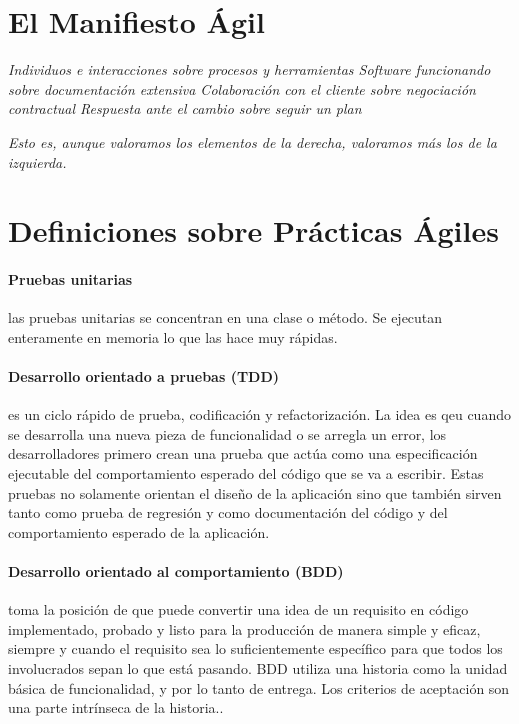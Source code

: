 \documentclass[journal]{IEEEtran}
\begin{document}
\appendices
\section{El Manifiesto Ágil}\label{apendice:a}

\begin{center}
\emph{Individuos e interacciones sobre procesos y herramientas
Software funcionando sobre documentación extensiva
Colaboración con el cliente sobre negociación contractual
Respuesta ante el cambio sobre seguir un plan}
\end{center}

\emph{Esto es, aunque valoramos los elementos de la derecha,
valoramos más los de la izquierda.}

\section{Definiciones sobre Prácticas Ágiles}\label{apendice:b}

\paragraph{Pruebas unitarias} las pruebas unitarias se concentran en una clase o método. Se ejecutan enteramente en memoria lo que las hace muy rápidas\cite{shore-warden}.

\paragraph{Desarrollo orientado a pruebas (TDD)} es un ciclo rápido de prueba, codificación y refactorización\cite{shore-warden}. La idea es qeu cuando se desarrolla una nueva pieza de funcionalidad o se arregla un error, los desarrolladores primero crean una prueba que actúa como una especificación ejecutable del comportamiento esperado del código que se va a escribir. Estas pruebas no solamente orientan el diseño de la aplicación sino que también sirven tanto como prueba de regresión y como documentación del código y del comportamiento esperado de la aplicación.\cite{humble}

\paragraph{Desarrollo orientado al comportamiento (BDD)} toma la posición de que puede convertir una idea de un requisito en código implementado, probado y listo para la producción de manera simple y eficaz, siempre y cuando el requisito sea lo suficientemente específico para que todos los involucrados sepan lo que está pasando. BDD utiliza una historia como la unidad básica de funcionalidad, y por lo tanto de entrega. Los criterios de aceptación son una parte intrínseca de la historia.\cite{michael-b}. 
\end{document}
